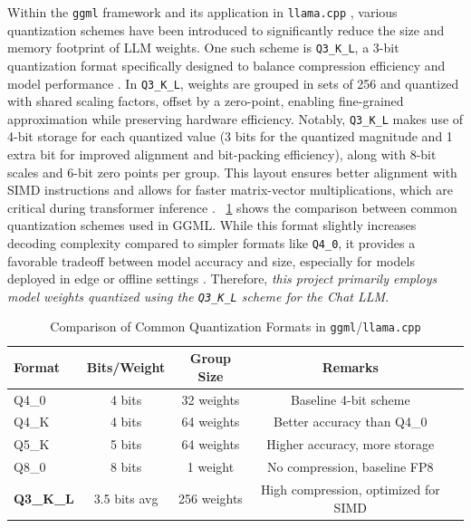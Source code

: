 Within the \texttt{ggml} framework and its application in \texttt{llama.cpp} \cite{llamacpp2023}, various quantization schemes have been introduced to significantly reduce the size and memory footprint of LLM weights. One such scheme is \texttt{Q3\_K\_L}, a 3-bit quantization format specifically designed to balance compression efficiency and model performance \cite{talamdupula2024guide,li2024quantization}. In \texttt{Q3\_K\_L}, weights are grouped in sets of 256 and quantized with shared scaling factors, offset by a zero-point, enabling fine-grained approximation while preserving hardware efficiency. Notably, \texttt{Q3\_K\_L} makes use of 4-bit storage for each quantized value (3 bits for the quantized magnitude and 1 extra bit for improved alignment and bit-packing efficiency), along with 8-bit scales and 6-bit zero points per group. This layout ensures better alignment with SIMD instructions and allows for faster matrix-vector multiplications, which are critical during transformer inference \cite{pope2022efficiently}. ~\ref{tab:quantization-comparison} shows the comparison between common quantization schemes used in GGML. While this format slightly increases decoding complexity compared to simpler formats like \texttt{Q4\_0}, it provides a favorable tradeoff between model accuracy and size, especially for models deployed in edge or offline settings \cite{ollama2023,llamafile2023}.
Therefore, \textit{this project primarily employs model weights quantized using the \texttt{Q3\_K\_L} scheme for the Chat LLM}.

\begin{table}[h]
\centering
\caption{Comparison of Common Quantization Formats in \texttt{ggml}/\texttt{llama.cpp}}
\label{tab:quantization-comparison}
\begin{tabular}{|l|c|c|c|c|}
\hline
\textbf{Format} & \textbf{Bits/Weight} & \textbf{Group Size} & \textbf{Remarks} \\ \hline
Q4\_0     & 4 bits   & 32 weights          & Baseline 4-bit scheme \\ \hline
Q4\_K     & 4 bits   & 64 weights    & Better accuracy than Q4\_0 \\ \hline
Q5\_K     & 5 bits   & 64 weights           & Higher accuracy, more storage \\ \hline
Q8\_0     & 8 bits   & 1 weight                          & No compression, baseline FP8 \\ \hline
\textbf{Q3\_K\_L}  & 3.5 bits avg & 256 weights  & High compression, optimized for SIMD \\ \hline
\end{tabular}
\end{table}


